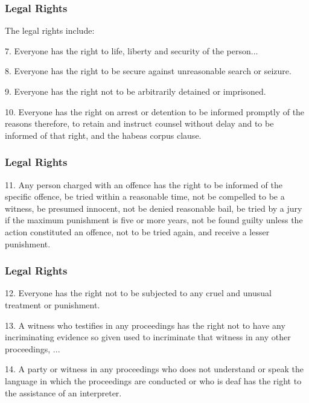 \begin{frame}
\frametitle{Legal Rights}

The legal rights include:

7. Everyone has the right to life, liberty and security of the person...

8. Everyone has the right to be secure against unreasonable search or seizure.

9. Everyone has the right not to be arbitrarily detained or imprisoned.

10. Everyone has the right on arrest or detention to be informed promptly of the reasons therefore, to retain and instruct counsel without delay and to be informed of that right, and the habeas corpus clause.

\end{frame}



\begin{frame}
\frametitle{Legal Rights}

11. Any person charged with an offence has the right to be informed of the specific offence, be tried within a reasonable time, not be compelled to be a witness, be presumed innocent, not be denied reasonable bail, be tried by a jury if the maximum punishment is five or more years, not be found guilty unless the action constituted an offence, not to be tried again, and receive a lesser punishment.

\end{frame}



\begin{frame}
\frametitle{Legal Rights}

12. Everyone has the right not to be subjected to any cruel and unusual treatment or punishment. 

13. A witness who testifies in any proceedings has the right not to have any incriminating evidence so given used to incriminate that witness in any other proceedings, ...

14. A party or witness in any proceedings who does not understand or speak the language in which the proceedings are conducted or who is deaf has the right to the assistance of an interpreter.

\end{frame}



